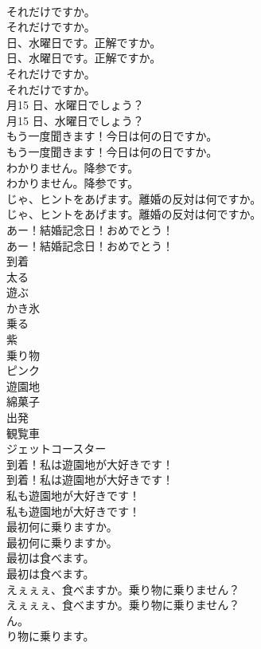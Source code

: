 \documentclass[8pt]{extreport}
\begin{document}
\begin{CJK}{UTF8}{min}
\\	それだけですか。	
\\	それだけですか。 
\\	日、水曜日です。正解ですか。	
\\	日、水曜日です。正解ですか。 
\\	それだけですか。	
\\	それだけですか。 
\\	月15 日、水曜日でしょう？	
\\	月15 日、水曜日でしょう？ 
\\	もう一度聞きます！今日は何の日ですか。	
\\	もう一度聞きます！今日は何の日ですか。 
\\	わかりません。降参です。	
\\	わかりません。降参です。 
\\	じゃ、ヒントをあげます。離婚の反対は何ですか。	
\\	じゃ、ヒントをあげます。離婚の反対は何ですか。 
\\	あー！結婚記念日！おめでとう！	
\\	あー！結婚記念日！おめでとう！ 
\\	到着
\\	太る
\\	遊ぶ
\\	かき氷
\\	乗る
\\	紫
\\	乗り物
\\	ピンク
\\	遊園地
\\	綿菓子
\\	出発
\\	観覧車
\\	ジェットコースター
\\	到着！私は遊園地が大好きです！	
\\	到着！私は遊園地が大好きです！ 
\\	私も遊園地が大好きです！	
\\	私も遊園地が大好きです！ 
\\	最初何に乗りますか。	
\\	最初何に乗りますか。 
\\	最初は食べます。	
\\	最初は食べます。 
\\	えぇぇぇ、食べますか。乗り物に乗りません？	
\\	えぇぇぇ、食べますか。乗り物に乗りません？ 
\\	ん。	
\\	り物に乗ります。	

\end{CJK}
\end{document}
